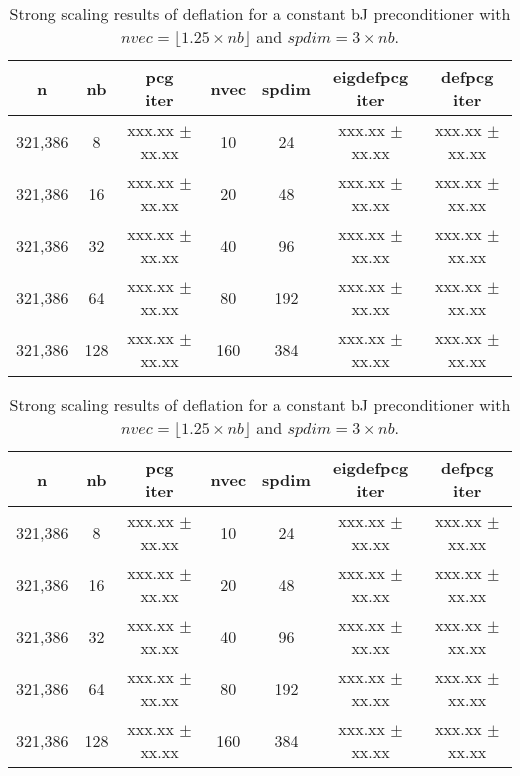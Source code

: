 \documentclass{article}
\begin{document}
\begin{table}[ht]
	\caption{Strong scaling results of deflation for a constant bJ preconditioner with $nvec=\lfloor1.25\times nb\rfloor$ and $spdim=3\times nb$.}
	\centering
	\begin{tabular}{|c|c|c|c|c|c|c|}
		\hline
		n & nb & \makecell{pcg\\ iter} & nvec & spdim & \makecell{eigdefpcg\\ iter} & \makecell{defpcg\\ iter}\\
		\hline
		321,386 &   8 & xxx.xx $\pm$ xx.xx &  10 &  24 & xxx.xx $\pm$ xx.xx & xxx.xx $\pm$ xx.xx \\
        321,386 &  16 & xxx.xx $\pm$ xx.xx &  20 &  48 & xxx.xx $\pm$ xx.xx & xxx.xx $\pm$ xx.xx \\
        321,386 &  32 & xxx.xx $\pm$ xx.xx &  40 &  96 & xxx.xx $\pm$ xx.xx & xxx.xx $\pm$ xx.xx \\
        321,386 &  64 & xxx.xx $\pm$ xx.xx &  80 & 192 & xxx.xx $\pm$ xx.xx & xxx.xx $\pm$ xx.xx \\
        321,386 & 128 & xxx.xx $\pm$ xx.xx & 160 & 384 & xxx.xx $\pm$ xx.xx & xxx.xx $\pm$ xx.xx \\
		\hline
	\end{tabular}
	\label{Tab:030}
\end{table}


\begin{table}[ht]
	\caption{Strong scaling results of deflation for a constant bJ preconditioner with $nvec=\lfloor1.25\times nb\rfloor$ and $spdim=3\times nb$.}
	\centering
	\begin{tabular}{|c|c|c|c|c|c|c|}
		\hline
		n & nb & \makecell{pcg\\ iter} & nvec & spdim & \makecell{eigdefpcg\\ iter} & \makecell{defpcg\\ iter}\\
		\hline
		321,386 &   8 & xxx.xx $\pm$ xx.xx &  10 &  24 & xxx.xx $\pm$ xx.xx & xxx.xx $\pm$ xx.xx \\
		321,386 &  16 & xxx.xx $\pm$ xx.xx &  20 &  48 & xxx.xx $\pm$ xx.xx & xxx.xx $\pm$ xx.xx \\
		321,386 &  32 & xxx.xx $\pm$ xx.xx &  40 &  96 & xxx.xx $\pm$ xx.xx & xxx.xx $\pm$ xx.xx \\
		321,386 &  64 & xxx.xx $\pm$ xx.xx &  80 & 192 & xxx.xx $\pm$ xx.xx & xxx.xx $\pm$ xx.xx \\
		321,386 & 128 & xxx.xx $\pm$ xx.xx & 160 & 384 & xxx.xx $\pm$ xx.xx & xxx.xx $\pm$ xx.xx \\
		\hline
	\end{tabular}
	\label{Tab:035}
\end{table}
\end{document}
